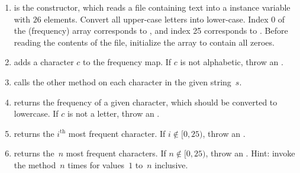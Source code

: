 
\newpage %

\begin{enumerate}[label=(\alph*)]
    \item {} is the constructor, which reads a file containing text into a  instance variable with $26$ elements. Convert all upper-case letters into lower-case. Index 0 of the (frequency) array corresponds to , and index 25 corresponds to . Before reading the contents of the file, initialize the array to contain all zeroes.
    \item {} adds a character $c$ to the frequency map. If $c$ is not alphabetic, throw an .
    \item {} calls the other  method on each character in the given string~$s$.
    \item {} returns the frequency of a given character, which should be converted to lowercase. If $c$ is not a letter, throw an .
    \item {} returns the $i^\text{th}$ most frequent character. If $i \not\in [0, 25)$, throw an .
    \item {} returns the~$n$ most frequent characters. If $n \not\in [0, 25)$, throw an . Hint: invoke the  method~$n$ times for values~$1$ to~$n$ inclusive.
\end{enumerate}

